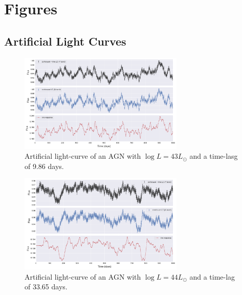 \documentclass[letterpaper, oneside]{article}
\begin{document}





\section*{Figures}

\subsection{Artificial Light Curves}

\begin{figure}[h]
	\centering
	\includegraphics[width=0.7\textwidth]{../lc_plots/art_lcs_logL43.pdf}
	\caption{Artificial light-curve of an AGN with $\log L = 43 L_{\odot}$ and a time-lasg of 9.86 days.}
	\label{fig:art_lcs_L43}
\end{figure}

\begin{figure}[h]
	\centering
	\includegraphics[width=0.7\textwidth]{../lc_plots/art_lcs_logL44.pdf}
	\caption{Artificial light-curve of an AGN with $\log L = 44 L_{\odot}$ and a time-lag of 33.65 days.}
	\label{fig:art_lcs_L44}
\end{figure}
\end{document}
